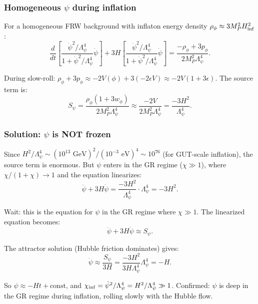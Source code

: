 \documentclass[11pt,a4paper]{article}
\begin{document}
\subsubsection{Homogeneous $\psi$ during inflation}

For a homogeneous FRW background with inflaton energy density $\rho_\phi \approx 3M_P^2 H_{\rm inf}^2$:
\begin{equation}
\frac{d}{dt}\left[\frac{\dot{\psi}^2/\Lambda_\psi^4}{1+\dot{\psi}^2/\Lambda_\psi^4}\dot{\psi}\right] + 3H\left[\frac{\dot{\psi}^2/\Lambda_\psi^4}{1+\dot{\psi}^2/\Lambda_\psi^4}\dot{\psi}\right] = \frac{-\rho_\phi + 3p_\phi}{2M_P^2\Lambda_\psi^4}.
\end{equation}

During slow-roll: $\rho_\phi + 3p_\phi \approx -2V(\phi) + 3(-2\epsilon V) \approx -2V(1+3\epsilon)$. The source term is:
\begin{equation}
S_\psi = \frac{\rho_\phi(1 + 3w_\phi)}{2M_P^2\Lambda_\psi^4} \approx \frac{-2V}{2M_P^2\Lambda_\psi^4} = \frac{-3H^2}{\Lambda_\psi^4}.
\end{equation}

\subsubsection{Solution: $\psi$ is NOT frozen}

Since $H^2/\Lambda_\psi^4 \sim (10^{13}\text{ GeV})^2/(10^{-3}\text{ eV})^4 \sim 10^{76}$ (for GUT-scale inflation), the source term is enormous. But $\psi$ enters in the GR regime ($\chi \gg 1$), where $\chi/(1+\chi) \to 1$ and the equation linearizes:
\begin{equation}
\ddot{\psi} + 3H\dot{\psi} = \frac{-3H^2}{\Lambda_\psi^4} \cdot \Lambda_\psi^4 = -3H^2.
\end{equation}

Wait: this is the equation for $\psi$ in the GR regime where $\chi \gg 1$. The linearized equation becomes:
\begin{equation}
\ddot{\psi} + 3H\dot{\psi} \approx S_\psi.
\end{equation}

The attractor solution (Hubble friction dominates) gives:
\begin{equation}
\dot{\psi} \approx \frac{S_\psi}{3H} = \frac{-3H^2}{3H\Lambda_\psi^4}\Lambda_\psi^4 = -H.
\end{equation}

So $\psi \approx -Ht + \text{const}$, and $\chi_{\rm inf} = \dot{\psi}^2/\Lambda_\psi^4 = H^2/\Lambda_\psi^4 \gg 1$. Confirmed: $\psi$ is deep in the GR regime during inflation, rolling slowly with the Hubble flow.
\end{document}

